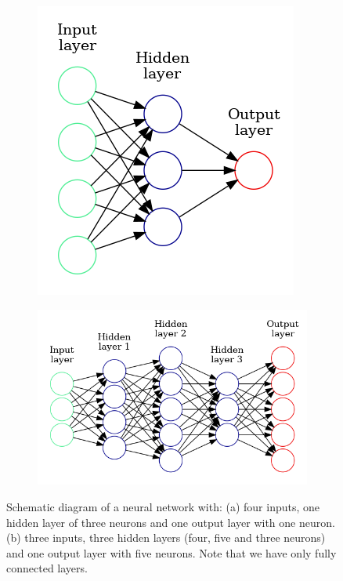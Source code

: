 \documentclass[../main.tex]{subfiles}
\begin{document}
\begin{figure}
     \centering
     \begin{subfigure}[b]{0.35\textwidth}
         \centering
         \includegraphics[width=\textwidth]{doc/assets/simple_neural_network_diagram.png}
         \caption{}
         \label{fig:simple_network}
     \end{subfigure}
     \quad
     \begin{subfigure}[b]{0.6\textwidth}
         \centering
         \includegraphics[width=\textwidth]{doc/assets/multi_class_neural_network_diagram.png}
         \caption{}
         \label{fig:multi_class_network}
     \end{subfigure}
        \caption{Schematic diagram of a neural network with: (a) four inputs, one hidden layer of three neurons and one output layer with one neuron. (b) three inputs, three hidden layers (four, five and three neurons) and one output layer with five neurons. Note that we have only fully connected layers.}
        \label{fig:network_diagrams}
\end{figure}
\end{document}
